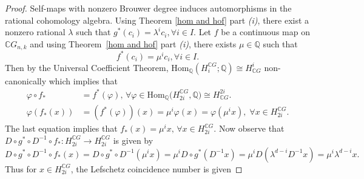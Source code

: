 \documentclass{amsart}
\newcommand{\thmref}[1]{Theorem~\ref{#1}}
\renewcommand{\hom}{\mathrm{Hom}}
\begin{document}
	
	\begin{proof}
	Self-maps with nonzero Brouwer degree induces automorphisms in the rational cohomology algebra. Using Theorem \ref{hom and hof} %
part \textit{(i)}, there %
exist a nonzero rational $\lambda$ such that $g^*(c_i)=\lambda^ic_i, \forall i\in I.$ Let $f$ be a continuous map on $\mathbb CG_{n,k}$ and using \thmref{hom and hof} %
part \textit{(i)}, there %
exists $\mu \in \mathbb Q$ such that
		\[
		f^*(c_i)=\mu^ic_i, \forall i\in I.
		\]
		Then by the Universal Coefficient Theorem, $ \hom_{\mathbb{Q}} (H_i^{\mathbb CG};\mathbb Q) \cong H^i_{\mathbb CG}$ non-canonically which implies %
that 
		\begin{align*}
			\varphi \circ f_* &= f^*(\varphi) , \, \forall
			\varphi \in \hom _{\mathbb Q}\big(H_{2i}^{\mathbb CG}, \mathbb Q\big)\cong H^{2i}_{\mathbb CG}.\\
			\varphi(f_*(x))&=(f^*(\varphi))(x)= \mu^i\varphi(x)=\varphi(\mu^ix),\; \forall x\in H_{2i}^{\mathbb CG}.
		\end{align*}
		The %
last equation implies that $f_*(x)=\mu^ix,\, \forall x\in  H_{2i}^{\mathbb CG}.$
		Now observe that $D\circ g^*\circ D^{-1}\circ f_*: H_{2i}^{\mathbb CG}\to H_{2i}^{\mathbb CG}$ is given %
by 
		\[
		D\circ g^*\circ D^{-1}\circ f_*(x)=D\circ g^*\circ D^{-1}(\mu^ix)=\mu^iD\circ g^*(D^{-1}x)=\mu^iD(\lambda^{d-i}D^{-1}x)=\mu^i\lambda^{d-i}x.
		\]
		Thus %
for $x\in H_{2i}^{\mathbb{C}G}$, the Lefschetz coincidence number is given %

\end{proof}
\end{document}
